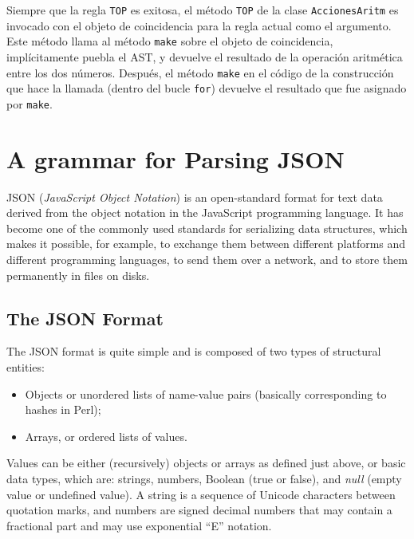 
Siempre que la regla {\tt TOP} es exitosa, el método {\tt TOP}
de la clase {\tt AccionesAritm} es invocado con el objeto de
coincidencia para la regla actual como el argumento. Este método
llama al método {\tt make} sobre el objeto de coincidencia, 
implícitamente puebla el AST, y devuelve el resultado de la
operación aritmética entre los dos números. Después, el método
{\tt make} en el código de la construcción que hace la llamada 
(dentro del bucle {\tt for}) devuelve el resultado que fue asignado
por {\tt make}.

\section{A grammar for Parsing JSON}

JSON (\emph{JavaScript Object Notation}) is an 
open-standard format for text data derived from 
the object notation in the JavaScript programming language. 
It has become one of the commonly used standards for 
serializing data structures, which makes it possible, for 
example, to exchange them between different platforms and 
different programming languages, to send them over a network, 
and to store them permanently in files on disks.

\subsection{The JSON Format}

The JSON format is quite simple and is composed of two types 
of structural entities:
\begin{itemize}
\item Objects or unordered lists of name-value pairs 
(basically corresponding to hashes in Perl);
\item Arrays, or ordered lists of values.
\end{itemize}

Values can be either (recursively) objects or arrays 
as defined just above, or basic data types, which are: 
strings, numbers, Boolean (true or false), and \emph{null} 
(empty value or undefined value). A string is a sequence 
of Unicode characters between quotation marks, and numbers 
are signed decimal numbers that may contain a fractional 
part and may use exponential ``E'' notation.

